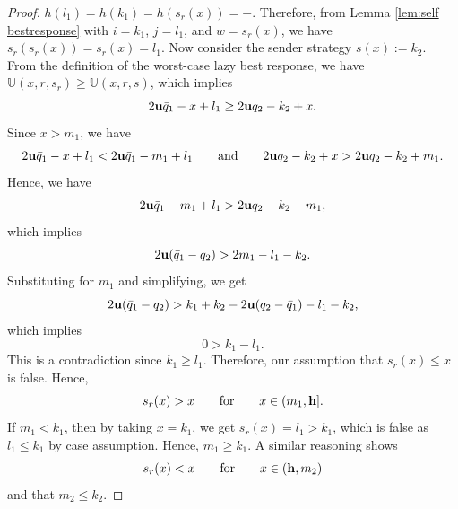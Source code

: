 \begin{proof}
        $h(l_1) = h(k_1) = h(s_r(x)) = \minus$. Therefore, from Lemma \ref{lem:self bestresponse} with $i = k_1$, $j = l_1$, and $w = s_r(x)$, we have $s_r(s_r(x)) = s_r(x) = l_1$. Now consider the sender strategy $s(x) := k_2$. From the definition of the worst-case lazy best response, we have $\mathbb{U}(x, r, s_r) \geq \mathbb{U}(x, r, s)$, which implies
        \[
        2\mathbf{u} \bar{q}_1 - x + l_1 \geq 2\mathbf{u} q_2 - k_2 + x.
        \]
        Since $x > m_1$, we have
        \[
        2\mathbf{u} \bar{q}_1 - x + l_1 < 2\mathbf{u} \bar{q}_1 - m_1 + l_1 \quad \hbox{\quad and\quad} \quad 2\mathbf{u} q_2 - k_2 + x > 2\mathbf{u} q_2 - k_2 + m_1.
        \]
        Hence, we have
        \[
        2\mathbf{u} \bar{q}_1 - m_1 + l_1 > 2\mathbf{u} q_2 -         k_2 + m_1,
        \]
        which implies
        \[
        2\mathbf{u} (\bar{q}_1 - q_2) > 2m_1 - l_1 - k_2.
        \]
        Substituting for $m_1$ and simplifying, we get
        \[
        2\mathbf{u} (\bar{q}_1 - q_2) > k_1 + k_2 - 2\mathbf{u} (q_2 - \bar{q}_1) - l_1 - k_2,
        \]
        which implies
        \[
        0 > k_1 - l_1.
        \]
        This is a contradiction since $k_1 \geq l_1$. Therefore, our assumption that $s_r(x) \leq x$ is false. Hence,
        \begin{equation}\label{eqn:lem:not crossing boundary 1}
            s_r(x) > x \quad \hbox{\quad for\quad} \quad x \in (m_1, \mathbf{h}].
        \end{equation}
        If $m_1 < k_1$, then by taking $x = k_1$, we get $s_r(x) = l_1 > k_1$, which is false as $l_1 \leq k_1$ by case assumption. Hence, $m_1 \geq k_1$. A similar reasoning shows
        \begin{equation}\label{eqn:lem:not crossing boundary 2}
            s_r(x) < x \quad \hbox{\quad for\quad} \quad x \in (\mathbf{h}, m_2)
        \end{equation}
        and that $m_2 \leq k_2$.


\end{proof}
